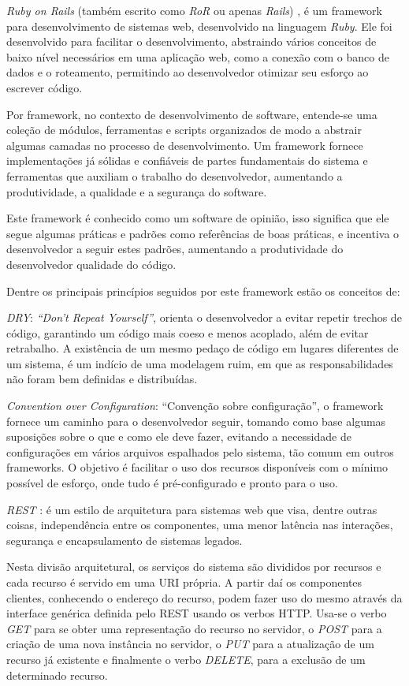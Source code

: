 \textit{Ruby on Rails} (também escrito como \textit{RoR} ou apenas \textit{Rails}) \cite{RAILS}, é um framework para desenvolvimento de sistemas web, desenvolvido na linguagem \textit{Ruby}. Ele foi desenvolvido para facilitar o desenvolvimento, abstraindo vários conceitos de baixo nível necessários em uma aplicação web, como a conexão com o banco de dados e o roteamento, permitindo ao desenvolvedor otimizar seu esforço ao escrever código.

Por framework, no contexto de desenvolvimento de software, entende-se uma coleção de módulos, ferramentas e scripts organizados de modo a abstrair algumas camadas no processo de desenvolvimento. Um framework fornece implementações já sólidas e confiáveis de partes fundamentais do sistema e ferramentas que auxiliam o trabalho do desenvolvedor, aumentando a produtividade, a qualidade e a segurança do software.

Este framework é conhecido como um software de opinião, isso significa que ele segue algumas práticas e padrões como referências de boas práticas, e incentiva o desenvolvedor a seguir estes padrões, aumentando a produtividade do desenvolvedor qualidade do código.

Dentre os principais princípios \cite{HANSSON} seguidos por este framework estão os conceitos de:

\textit{DRY}: \textit{“Don’t Repeat Yourself”}, orienta o desenvolvedor a evitar repetir trechos de código, garantindo um código mais coeso e menos acoplado, além de evitar retrabalho. A existência de um mesmo pedaço de código em lugares diferentes de um sistema, é um indício de uma modelagem ruim, em que as responsabilidades não foram bem definidas e distribuídas.

\textit{Convention over Configuration}: “Convenção sobre configuração”, o framework fornece um caminho para o desenvolvedor seguir, tomando como base algumas suposições sobre o que e como ele deve fazer, evitando a necessidade de configurações em vários arquivos espalhados pelo sistema, tão comum em outros frameworks. O objetivo é facilitar o uso dos recursos disponíveis com o mínimo possível de esforço, onde tudo é pré-configurado e pronto para o uso.

\textit{REST} \cite{FIELDING}: é um estilo de arquitetura para sistemas web que visa, dentre outras coisas, independência entre os componentes, uma menor latência nas interações, segurança e encapsulamento de sistemas legados.

Nesta divisão arquitetural, os serviços do sistema são divididos por recursos e cada recurso é servido em uma URI própria. A partir daí os componentes clientes, conhecendo o endereço do recurso, podem fazer uso do mesmo através da interface genérica definida pelo REST usando os verbos HTTP. Usa-se o verbo \textit{GET} para se obter uma representação do recurso no servidor, o \textit{POST} para a criação de uma nova instância no servidor, o \textit{PUT} para a atualização de um recurso já existente e finalmente o verbo \textit{DELETE}, para a exclusão de um determinado recurso.

